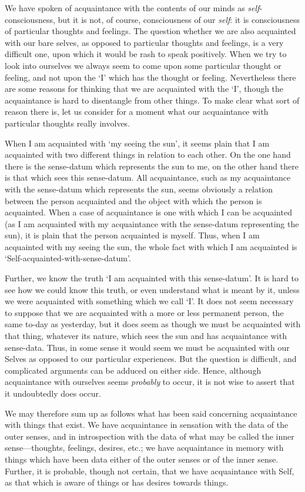 \documentclass[oneside,letterpaper,12pt]{book}
\begin{document}
We have spoken of acquaintance with the contents of our minds as
\emph{self}-consciousness, but it is not, of course, consciousness of
our \emph{self}: it is consciousness of particular thoughts and
feelings. The question whether we are also acquainted with our bare
selves, as opposed to particular thoughts and feelings, is a very
difficult one, upon which it would be rash to speak positively. When we
try to look into ourselves we always seem to come upon some particular
thought or feeling, and not upon the
`I' which has the thought or feeling.
Nevertheless there are some reasons for thinking that we are acquainted
with the `I', though the acquaintance is
hard to disentangle from other things. To make clear what sort of reason
there is, let us consider for a moment what our acquaintance with
particular thoughts really involves.

When I am acquainted with `my seeing the
sun', it seems plain that I am acquainted with two
different things in relation to each other. On the one hand there is the
sense-datum which represents the sun to me, on the other hand there is
that which sees this sense-datum. All acquaintance, such as my
acquaintance with the sense-datum which represents the sun, seems
obviously a relation between the person acquainted and the object with
which the person is acquainted. When a case of acquaintance is one with
which I can be acquainted (as I am acquainted with my acquaintance with
the sense-datum representing the sun), it is plain that the person
acquainted is myself. Thus, when I am acquainted with my seeing the sun,
the whole fact with which I am acquainted is
`Self-acquainted-with-sense-datum'.

Further, we know the truth `I am acquainted with this
sense-datum'. It is hard to see how we could know this
truth, or even understand what is meant by it, unless we were acquainted
with something which we call `I'. It does
not seem necessary to suppose that we are acquainted with a more or less
permanent person, the same to-day as yesterday, but it does seem as
though we must be acquainted with that thing, whatever its nature, which
sees the sun and has acquaintance with sense-data. Thus, in some sense
it would seem we must be acquainted with our Selves as opposed to our
particular experiences. But the question is difficult, and complicated
arguments can be adduced on either side. Hence, although acquaintance
with ourselves seems \emph{probably} to occur, it is not wise to assert
that it undoubtedly does occur.

\label{acquaintance} We may therefore sum up as follows what has been said concerning
acquaintance with things that exist. We have acquaintance in sensation
with the data of the outer senses, and in introspection with the data of
what may be called the inner sense---thoughts, feelings, desires, etc.;
we have acquaintance in memory with things which have been data either
of the outer senses or of the inner sense. Further, it is probable,
though not certain, that we have acquaintance with Self, as that which
is aware of things or has desires towards things.
\end{document}

